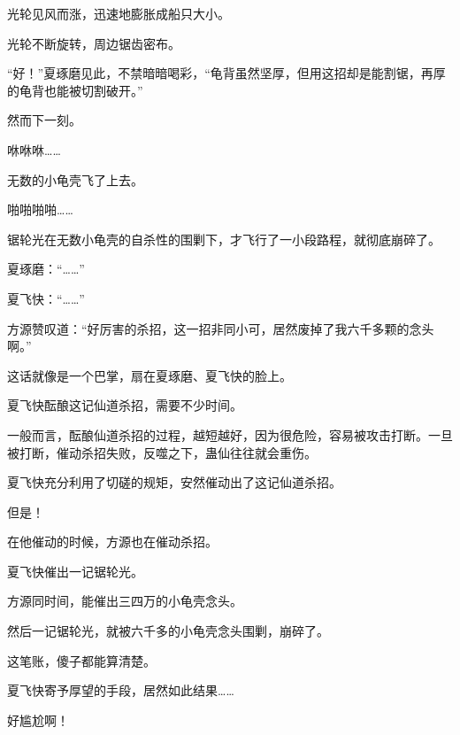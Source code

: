 \begin{this_body}
光轮见风而涨，迅速地膨胀成船只大小。

光轮不断旋转，周边锯齿密布。

“好！”夏琢磨见此，不禁暗暗喝彩，“龟背虽然坚厚，但用这招却是能割锯，再厚的龟背也能被切割破开。”

然而下一刻。

咻咻咻……

无数的小龟壳飞了上去。

啪啪啪啪……

锯轮光在无数小龟壳的自杀性的围剿下，才飞行了一小段路程，就彻底崩碎了。

夏琢磨：“……”

夏飞快：“……”

方源赞叹道：“好厉害的杀招，这一招非同小可，居然废掉了我六千多颗的念头啊。”

这话就像是一个巴掌，扇在夏琢磨、夏飞快的脸上。

夏飞快酝酿这记仙道杀招，需要不少时间。

一般而言，酝酿仙道杀招的过程，越短越好，因为很危险，容易被攻击打断。一旦被打断，催动杀招失败，反噬之下，蛊仙往往就会重伤。

夏飞快充分利用了切磋的规矩，安然催动出了这记仙道杀招。

但是！

在他催动的时候，方源也在催动杀招。

夏飞快催出一记锯轮光。

方源同时间，能催出三四万的小龟壳念头。

然后一记锯轮光，就被六千多的小龟壳念头围剿，崩碎了。

这笔账，傻子都能算清楚。

夏飞快寄予厚望的手段，居然如此结果……

好尴尬啊！

\end{this_body}

